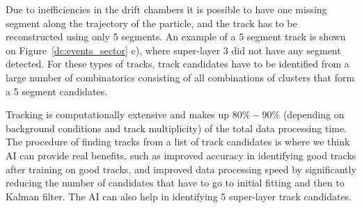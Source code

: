 Due to inefficiencies in the drift chambers it is possible to have one missing segment along the trajectory of the particle, and the track has to be reconstructed using only 5 segments. An example of a 5 segment track is shown on Figure~\ref{dc:events_sector} c), where super-layer 3 did not have any segment detected. For these types of tracks, track candidates have to be identified from a large number of combinatorics consisting of all combinations of clusters that form a  5 segment candidates. 

Tracking is computationally extensive and makes up $80\%-90\%$ (depending on background conditions and track multiplicity) of the total data processing time. The procedure of finding tracks from a list of track candidates is where we think AI can provide real benefits, such as improved accuracy in identifying good tracks after training on good tracks, and improved data processing speed by significantly reducing the number of candidates that have to go to initial fitting and then to Kalman filter. The AI can also help in identifying 5 super-layer track candidates.

